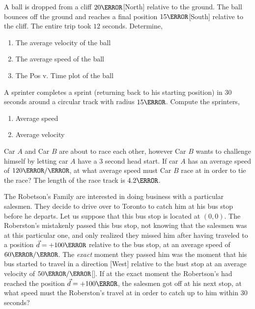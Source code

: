 \documentclass[12pt]{article} %
\newcommand{\tx}[1]{\text{#1}}
\begin{document}
\begin{qstn}[5]
A ball is dropped from a cliff $20\m$[North] relative to the ground. The ball bounces off the ground and reaches a final position $15\m$[South] relative to the cliff. The entire trip took $12$ seconds. Determine,
\begin{enumerate}[label = (\alph*)]
    \item The average velocity of the ball
    \item The average speed of the ball
    \item The Pos v. Time plot of the ball
\end{enumerate}

\end{qstn}


\begin{qstn}[6]
    A sprinter completes a sprint (returning back to his starting position) in $30$ seconds around a circular track with radius $15\m$. Compute the sprinters,
    \begin{enumerate}[label = (\alph*)]
        \item Average speed
        \item Average velocity
    \end{enumerate}


\end{qstn}


\begin{qstn}[7]
    Car $A$ and Car $B$ are about to race each other, however Car $B$ wants to challenge himself by letting car $A$ have a $3$ second head start. If car $A$ has an average speed of $120 \m / \s$, at what average speed must Car $B$ race at in order to tie the race? The length of the race track is $4.2 \km$.
\end{qstn}


\begin{qstn}[8]
    The Robetson's Family are interested in doing business with a particular salesmen. They decide to drive over to Toronto to catch him at his bus stop before he departs. Let us suppose that this bus stop is located at $(0,0)$. The Roberston's mistakenly passed this bus stop, not knowing that the salesmen was at this particular one, and only realized they missed him after having traveled to a position $\vec d = +100\m$ relative to the bus stop, at an average speed of $60 \m / \s$. The \emph{exact} moment they passed him was the moment that his bus started to travel in a direction [West] relative to the bust stop at an average velocity of $50 \m / \s $[\tx{West}]. If at the exact moment the Robertson's had reached the position $\vec d = +100\m$, the salesmen got off at his next stop, at what speed must the Roberston's travel at in order to catch up to him within $30$ seconds?
    \end{qstn}


 
\end{document}
